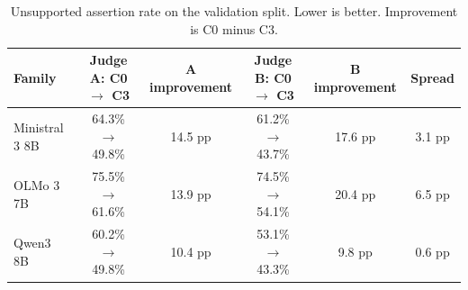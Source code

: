 \begin{table}[t]
\centering
\caption{Unsupported assertion rate on the validation split. Lower is better. Improvement is C0 minus C3.}
\label{tab:uar}
\scriptsize
\begin{tabular}{@{}lccccc@{}}
\toprule
\textbf{Family} & \textbf{Judge A: C0 $\rightarrow$ C3} & \textbf{A improvement} & \textbf{Judge B: C0 $\rightarrow$ C3} & \textbf{B improvement} & \textbf{Spread} \\
\midrule
Ministral 3 8B & 64.3\% $\rightarrow$ 49.8\% & 14.5 pp & 61.2\% $\rightarrow$ 43.7\% & 17.6 pp & 3.1 pp \\
OLMo 3 7B & 75.5\% $\rightarrow$ 61.6\% & 13.9 pp & 74.5\% $\rightarrow$ 54.1\% & 20.4 pp & 6.5 pp \\
Qwen3 8B & 60.2\% $\rightarrow$ 49.8\% & 10.4 pp & 53.1\% $\rightarrow$ 43.3\% & 9.8 pp & 0.6 pp \\
\bottomrule
\end{tabular}
\end{table}

